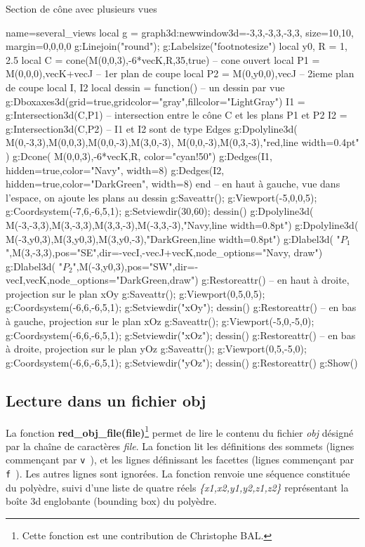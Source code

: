 \begin{demo}{Section de cône avec plusieurs vues}
\begin{luadraw}{name=several_views}
local g = graph3d:new{window3d={-3,3,-3,3,-3,3}, size={10,10}, margin={0,0,0,0}}
g:Linejoin("round"); g:Labelsize("footnotesize")
local y0, R = 1, 2.5
local C = cone(M(0,0,3),-6*vecK,R,35,true) -- cone ouvert
local P1 = {M(0,0,0),vecK+vecJ} -- 1er plan de coupe
local P2 = {M(0,y0,0),vecJ} -- 2ieme plan de coupe
local I, I2 
local dessin = function() -- un dessin par vue
    g:Dboxaxes3d({grid=true,gridcolor="gray",fillcolor="LightGray"})
    I1 = g:Intersection3d(C,P1) -- intersection entre le cône C et les plans P1 et P2
    I2 = g:Intersection3d(C,P2) -- I1 et I2 sont de type Edges
    g:Dpolyline3d( {{M(0,-3,3),M(0,0,3),M(0,0,-3),M(3,0,-3)}, {M(0,0,-3),M(0,3,-3)}},"red,line width=0.4pt" )
    g:Dcone( M(0,0,3),-6*vecK,R, {color="cyan!50"})
    g:Dedges(I1, {hidden=true,color="Navy", width=8})
    g:Dedges(I2, {hidden=true,color="DarkGreen", width=8})
end
-- en haut à gauche, vue dans l'espace, on ajoute les plans au dessin
g:Saveattr(); g:Viewport(-5,0,0,5); g:Coordsystem(-7,6,-6,5,1); g:Setviewdir(30,60); dessin()
g:Dpolyline3d( {M(-3,-3,3),M(3,-3,3),M(3,3,-3),M(-3,3,-3)},"Navy,line width=0.8pt")
g:Dpolyline3d( {M(-3,y0,3),M(3,y0,3),M(3,y0,-3)},"DarkGreen,line width=0.8pt")
g:Dlabel3d( "$P_1$",M(3,-3,3),{pos="SE",dir={-vecI,-vecJ+vecK},node_options="Navy, draw"})
g:Dlabel3d( "$P_2$",M(-3,y0,3),{pos="SW",dir={-vecI,vecK},node_options="DarkGreen,draw"})
g:Restoreattr()
-- en haut à droite, projection sur le plan xOy
g:Saveattr(); g:Viewport(0,5,0,5); g:Coordsystem(-6,6,-6,5,1); g:Setviewdir("xOy"); dessin()
g:Restoreattr()
-- en bas à gauche, projection sur le plan xOz
g:Saveattr(); g:Viewport(-5,0,-5,0); g:Coordsystem(-6,6,-6,5,1); g:Setviewdir("xOz"); dessin()
g:Restoreattr()
-- en bas à droite, projection sur le plan yOz
g:Saveattr(); g:Viewport(0,5,-5,0); g:Coordsystem(-6,6,-6,5,1); g:Setviewdir("yOz"); dessin()
g:Restoreattr()
g:Show()
\end{luadraw}
\end{demo}

\subsection{Lecture dans un fichier obj}

La fonction \textbf{red\_obj\_file(file)}\footnote{Cette fonction est une contribution de Christophe BAL.} permet de lire le contenu du fichier \emph{obj} désigné par la chaîne de caractères \emph{file}. La fonction lit les définitions des sommets (lignes commençant par \verb|v |), et les lignes définissant les facettes (lignes commençant par \verb|f |). Les autres lignes sont ignorées. La fonction renvoie une séquence constituée du polyèdre, suivi d'une liste de quatre réels \emph{\{x1,x2,y1,y2,z1,z2\}} représentant la boîte 3d englobante (bounding box) du polyèdre.

